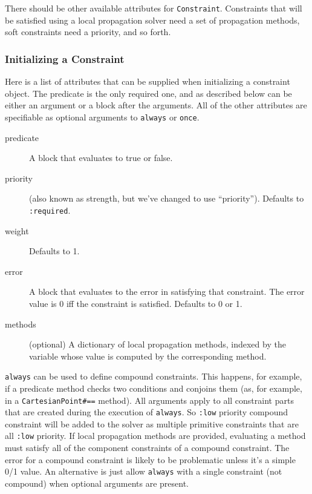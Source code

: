 There should be other available attributes for
\lstinline{Constraint}.  Constraints that will be satisfied
using a local propagation solver need a set of propagation methods,
soft constraints need a priority, and so forth.  

\subsubsection{Initializing a Constraint}

Here is a list of attributes that can be supplied when initializing a
constraint object.  The predicate is the only required one, and as
described below can be either an argument or a block after the
arguments.  All of the other attributes are specifiable as optional
arguments to \lstinline{always} or \lstinline{once}.

\begin{description}
\item[predicate] A block that evaluates to true or false.  
\item[priority] (also known as strength, but we've changed to use
  ``priority'').  Defaults to \lstinline{:required}.
\item[weight] Defaults to 1.
\item[error] A block that evaluates to the error in satisfying that
  constraint.  The error value is 0 iff the constraint is satisfied.
  Defaults to 0 or 1.
\item[methods] (optional) A dictionary of local propagation methods, indexed by
  the variable whose value is computed by the corresponding
  method.
\end{description}

\lstinline{always} can be used to define compound constraints. This
happens, for example, if a predicate method checks two conditions and
conjoins them (as, for example, in a \lstinline{CartesianPoint#==}
method).  All arguments apply to all constraint parts that are created
during the execution of \lstinline{always}. So \lstinline{:low} priority
compound constraint will be added to the solver as multiple primitive
constraints that are all \lstinline{:low} priority.  If local propagation
methods are provided, evaluating a method must satisfy all of the
component constraints of a compound constraint.  The error for a
compound constraint is likely to be problematic unless it's a simple
0/1 value. An alternative is just allow \lstinline{always} with a
single constraint (not compound) when optional arguments are present.

